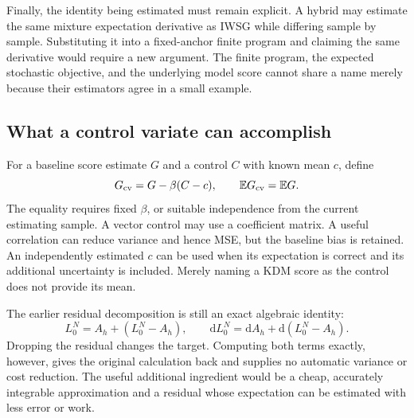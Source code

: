 \documentclass[11pt]{article}
\newcommand{\dd}{\mathrm{d}}
\begin{document}
Finally, the identity being estimated must remain explicit. A hybrid may
estimate the same mixture expectation derivative as IWSG while differing
sample by sample. Substituting it into a fixed-anchor finite program and
claiming the same derivative would require a new argument. The finite
program, the expected stochastic objective, and the underlying model score
cannot share a name merely because their estimators agree in a small example.

\subsection{What a control variate can accomplish}

For a baseline score estimate $G$ and a control $C$ with known mean $c$, define
\begin{equation}
 G_{\rm cv}=G-\beta(C-c),\qquad
 \mathbb E G_{\rm cv}=\mathbb E G.
 \label{eq:score-control-variate}
\end{equation}
The equality requires fixed $\beta$, or suitable independence from the
current estimating sample. A vector control may use a coefficient matrix.
A useful correlation can reduce variance and hence MSE, but the baseline
bias is retained. An independently estimated $c$ can be used when its
expectation is correct and its additional uncertainty is included. Merely
naming a KDM score as the control does not provide its mean.

The earlier residual decomposition is still an exact algebraic identity:
\begin{equation}
 L_0^N=A_h+\left(L_0^N-A_h\right),\qquad
 \dd L_0^N=\dd A_h+\dd\left(L_0^N-A_h\right).
 \label{eq:residual}
\end{equation}
Dropping the residual changes the target. Computing both terms exactly,
however, gives the original calculation back and supplies no automatic
variance or cost reduction. The useful additional ingredient would be a
cheap, accurately integrable approximation and a residual whose expectation
can be estimated with less error or work.
\end{document}
